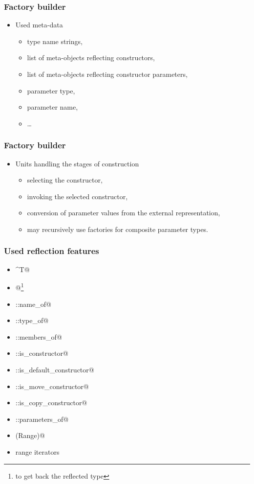 \documentclass[compress,table,xcolor=table]{beamer}
\begin{document}
\begin{frame}
  \frametitle{Factory builder}
  \Huge
	\begin{itemize}
	\item{Used meta-data}
      	\begin{itemize}
		\Large
		\item type name strings,
		\item list of meta-objects reflecting constructors,
		\item list of meta-objects reflecting constructor parameters,
		\item parameter type,
		\item parameter name,
		\item \ldots
      	\end{itemize}
	\end{itemize}
\end{frame}
\begin{frame}
  \frametitle{Factory builder}
  \Huge
  \begin{itemize}
	\item{Units handling the stages of construction}
      	\begin{itemize}
		\Large
		\item selecting the  constructor,
		\item invoking the selected constructor,
		\item conversion of parameter values from the external representation,
		\item may recursively use factories for composite parameter types.
		\end{itemize}
  \end{itemize}
\end{frame}
\begin{frame}[fragile]
  \frametitle{Used reflection features}
  \large
	\begin{itemize}
		\item \verb@^T@
		\item \verb@[: :]@\footnote{to get back the reflected type}
		\item \verb@meta::name_of@
		\item \verb@meta::type_of@
		\item \verb@meta::members_of@
		\item \verb@meta::is_constructor@
		\item \verb@meta::is_default_constructor@
		\item \verb@meta::is_move_constructor@
		\item \verb@meta::is_copy_constructor@
		\item \verb@meta::parameters_of@
		\item \verb@size(Range)@
		\item range iterators
	\end{itemize}
\end{frame}
\end{document}
